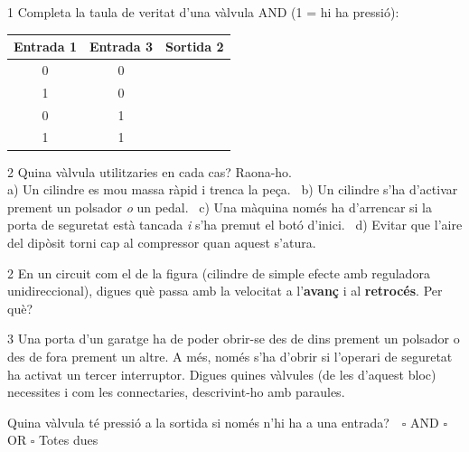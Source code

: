 \begin{exercici}{1}
Completa la taula de veritat d'una vàlvula AND (1 = hi ha pressió):
\begin{center}
\renewcommand{\arraystretch}{1.5}
\begin{tabular}{|c|c|c|}
\hline
Entrada 1 & Entrada 3 & Sortida 2\\\hline
0 & 0 & \\\hline
1 & 0 & \\\hline
0 & 1 & \\\hline
1 & 1 & \\\hline
\end{tabular}
\end{center}
\end{exercici}

\begin{exercici}{2}
Quina vàlvula utilitzaries en cada cas? Raona-ho.\\
a) Un cilindre es mou massa ràpid i trenca la peça. \ b) Un cilindre s'ha d'activar prement un polsador \emph{o} un pedal. \ c) Una màquina només ha d'arrencar si la porta de seguretat està tancada \emph{i} s'ha premut el botó d'inici. \ d) Evitar que l'aire del dipòsit torni cap al compressor quan aquest s'atura.
\end{exercici}

\begin{exercici}{2}
En un circuit com el de la figura (cilindre de simple efecte amb reguladora unidireccional), digues què passa amb la velocitat a l'\textbf{avanç} i al \textbf{retrocés}. Per què?
\end{exercici}

\begin{exercici}{3}
Una porta d'un garatge ha de poder obrir-se des de dins prement un polsador o des de fora prement un altre. A més, només s'ha d'obrir si l'operari de seguretat ha activat un tercer interruptor. Digues quines vàlvules (de les d'aquest bloc) necessites i com les connectaries, descrivint-ho amb paraules.
\end{exercici}

\begin{comprova}
Quina vàlvula té pressió a la sortida si només n'hi ha a una entrada?\ \ $\square$ AND \quad $\square$ OR \quad $\square$ Totes dues
\end{comprova}
